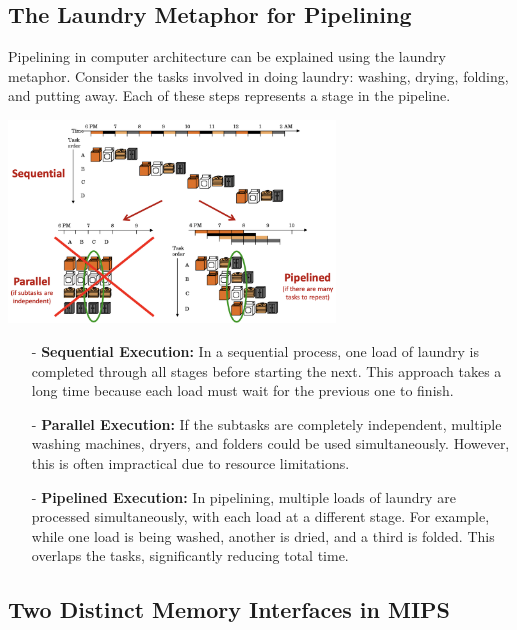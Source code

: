\subsection{The Laundry Metaphor for Pipelining}
Pipelining in computer architecture can be explained using the laundry metaphor. Consider the tasks involved in doing laundry: washing, drying, folding, and putting away. Each of these steps represents a stage in the pipeline.
\begin{center}
    \includegraphics[width=0.65\textwidth]{chapters/chapter4c/images/laundry.png}
\end{center}
\begin{itemize}
    \item[-] \textbf{Sequential Execution:} In a sequential process, one load of laundry is completed through all stages before starting the next. This approach takes a long time because each load must wait for the previous one to finish.
    \item[-] \textbf{Parallel Execution:} If the subtasks are completely independent, multiple washing machines, dryers, and folders could be used simultaneously. However, this is often impractical due to resource limitations.
    \item[-] \textbf{Pipelined Execution:} In pipelining, multiple loads of laundry are processed simultaneously, with each load at a different stage. For example, while one load is being washed, another is dried, and a third is folded. This overlaps the tasks, significantly reducing total time.
\end{itemize}

\newpage
\subsection{Two Distinct Memory Interfaces in MIPS}

